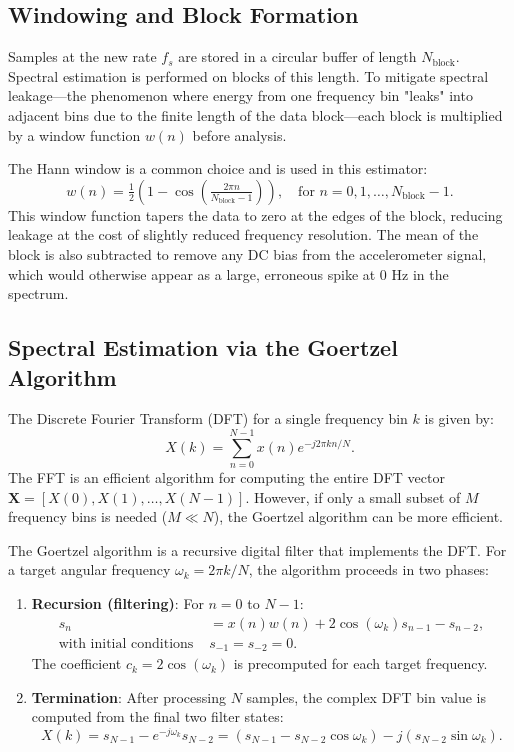 \documentclass[11pt,letterpaper]{article}
\begin{document}
    \subsection{Windowing and Block Formation}
    Samples at the new rate $f_s$ are stored in a circular buffer of length $N_\text{block}$. Spectral estimation is performed on blocks of this length. To mitigate spectral leakage—the phenomenon where energy from one frequency bin "leaks" into adjacent bins due to the finite length of the data block—each block is multiplied by a window function $w(n)$ before analysis.

    The Hann window is a common choice and is used in this estimator:
    \begin{equation}
        w(n) = \tfrac{1}{2}\left(1 - \cos\left(\tfrac{2\pi n}{N_\text{block}-1}\right)\right), \quad \text{for } n = 0, 1, \dots, N_\text{block}-1.
    \end{equation}
    This window function tapers the data to zero at the edges of the block, reducing leakage at the cost of slightly reduced frequency resolution. The mean of the block is also subtracted to remove any DC bias from the accelerometer signal, which would otherwise appear as a large, erroneous spike at 0 Hz in the spectrum.

    \subsection{Spectral Estimation via the Goertzel Algorithm}
    \label{subsec:goertzel}
    The Discrete Fourier Transform (DFT) for a single frequency bin $k$ is given by:
    \begin{equation}
        X(k) = \sum_{n=0}^{N-1} x(n) e^{-j 2\pi k n / N}.
    \end{equation}
    The FFT is an efficient algorithm for computing the entire DFT vector $\mathbf{X} = [X(0), X(1), \dots, X(N-1)]$. However, if only a small subset of $M$ frequency bins is needed ($M \ll N$), the Goertzel algorithm can be more efficient.

    The Goertzel algorithm is a recursive digital filter that implements the DFT. For a target angular frequency $\omega_k = 2\pi k / N$, the algorithm proceeds in two phases:
    \begin{enumerate}
        \item \textbf{Recursion (filtering)}: For $n = 0$ to $N-1$:
        \begin{align}
            s_n &= x(n) w(n) + 2 \cos(\omega_k) s_{n-1} - s_{n-2}, \\
            \text{with initial conditions } & s_{-1} = s_{-2} = 0.
        \end{align}
        The coefficient $c_k = 2\cos(\omega_k)$ is precomputed for each target frequency.
        \item \textbf{Termination}: After processing $N$ samples, the complex DFT bin value is computed from the final two filter states:
        \begin{equation}
            X(k) = s_{N-1} - e^{-j\omega_k} s_{N-2} = (s_{N-1} - s_{N-2}\cos\omega_k) - j (s_{N-2}\sin\omega_k).
        \end{equation}
    \end{enumerate}
\end{document}

